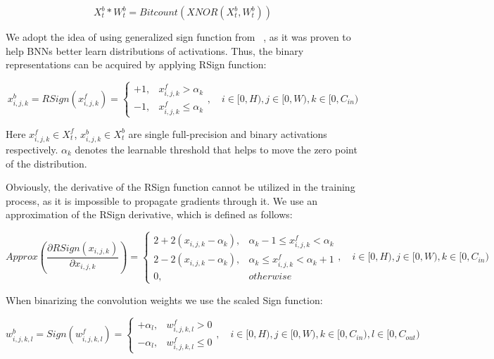 \documentclass{article}
\begin{document}
\begin{equation*}
    X_t^b \ast W_t^b = Bitcount(XNOR(X_t^b, W_t^b))
\end{equation*}

We adopt the idea of using generalized sign function from ~\cite{liu2020reactnet}, as it was proven to help BNNs better learn distributions of activations. Thus, the binary representations can be acquired by applying RSign function:

\begin{equation}
    x_{i, j, k}^b = RSign(x_{i, j, k}^f) = 
    \begin{cases}
        +1, & x_{i, j, k}^f > \alpha_k \\
        -1, & x_{i, j, k}^f \le \alpha_k 
    \end{cases}, \quad
    i \in [0, H), j \in [0, W), k \in [0, C_{in})
\label{eq_act_sign}
\end{equation}

Here $x_{i, j, k}^f \in X_t^f$, $x_{i, j, k}^b \in X_t^b$ are single full-precision and binary activations respectively. $\alpha_k$ denotes the learnable threshold that helps to move the zero point of the distribution.


Obviously, the derivative of the RSign function cannot be utilized in the training process, as it is impossible to propagate gradients through it. We use an approximation of the RSign derivative, which is defined as follows:

\begin{equation}
    Approx\left(\dfrac{\partial RSign(x_{i, j, k})}{\partial x_{i, j, k}}\right) = 
    \begin{cases}
        2 + 2(x_{i, j, k} -  \alpha_k), & \alpha_k - 1 \le x_{i, j, k}^f < \alpha_k \\
        2 - 2(x_{i, j, k} -  \alpha_k), & \alpha_k \le x_{i, j, k}^f < \alpha_k + 1 \\
        0, & otherwise
    \end{cases}, \quad
    i \in [0, H), j \in [0, W), k \in [0, C_{in})
\label{eq_act_sign}
\end{equation}

When binarizing the convolution weights we use the scaled Sign function:

\begin{equation}
    w_{i, j, k, l}^b = Sign(w_{i, j, k, l}^f) = 
    \begin{cases}
        +\alpha_l, & w_{i, j, k, l}^f > 0 \\
        -\alpha_l, & w_{i, j, k, l}^f \le 0
    \end{cases}, \quad
    i \in [0, H), j \in [0, W), k \in [0, C_{in}), l \in [0, C_{out})
\end{equation}
\end{document}
